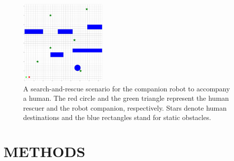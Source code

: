 \documentclass[letterpaper, 10 pt, conference]{ieeeconf}
\begin{document}
	
	\begin{figure}
		\centering		
		\includegraphics[width=0.38\textwidth]{figures/sim_traj_init}		
		\caption{A search-and-rescue scenario for the companion robot to accompany a human. The red circle and the green triangle represent the human rescuer and the robot companion, respectively. Stars denote human destinations and the blue rectangles stand for static obstacles.}
		\label{fig:ref_traj_init}
	\end{figure}
	
	
	\section{METHODS} \label{sec:framework}
	
\end{document}

